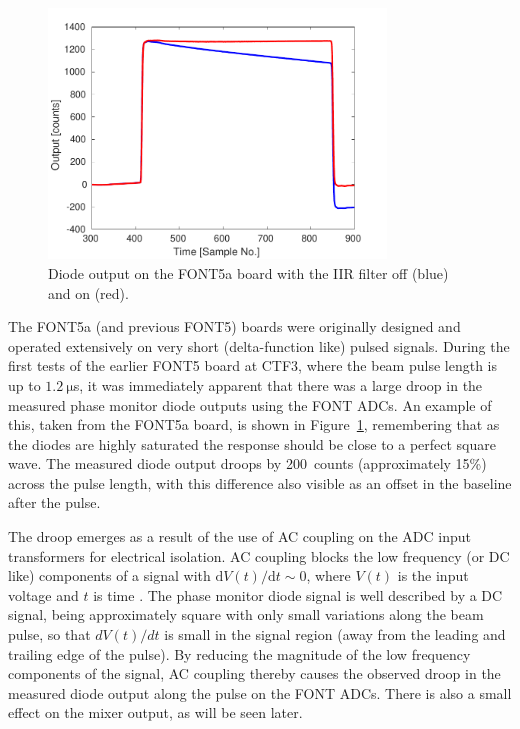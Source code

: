 \begin{figure}
  \centering
  \includegraphics[width=0.8\textwidth]{Figures/commissioning/iirDiodeFiltOffOn}
  \caption{Diode output on the FONT5a board with the IIR filter off (blue) and on (red).}
  \label{f:iirDiodefiltOffOn}
\end{figure}

The FONT5a (and previous FONT5) boards were originally designed and operated extensively on very short (delta-function like) pulsed signals.
During the first tests of the earlier FONT5 board at CTF3, where the beam pulse length is up to \(1.2~\mathrm{\mu}\)s, it was immediately apparent that there was a large droop in the measured phase monitor diode outputs using the FONT ADCs. An example of this, taken from the FONT5a board, is shown in Figure~\ref{f:iirDiodefiltOffOn}, remembering that as the diodes are highly saturated the response should be close to a perfect square wave. The measured diode output droops by 200~counts (approximately 15\%) across the pulse length, with this difference also visible as an offset in the baseline after the pulse.

The droop emerges as a result of the use of AC coupling on the ADC input transformers for electrical isolation. 
AC coupling blocks the low frequency (or DC like) components of a signal with  \({\mathrm{d}V(t)}/{\mathrm{d}t}\sim0\), where \(V(t)\) is the input voltage and \(t\) is time \cite{acCoupling}. 
The phase monitor diode signal is  well described by a DC signal, being approximately square with only small variations along the beam pulse, so that \({dV(t)}/{dt}\) is small in the signal region (away from the leading and trailing edge of the pulse). By reducing the magnitude of the low frequency components of the signal, AC coupling thereby causes the observed droop in the measured diode output along the pulse on the FONT ADCs.
There is also a small effect on the mixer output, as will be seen later.

